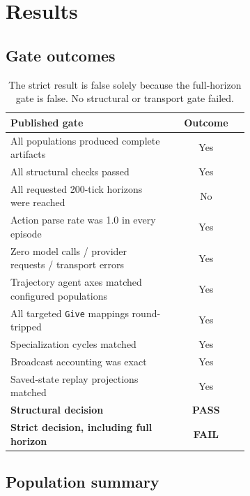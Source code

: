 \documentclass[11pt]{article}
\newcommand{\pass}{\textcolor{passgreen}{\textbf{PASS}}}
\newcommand{\fail}{\textcolor{failred}{\textbf{FAIL}}}
\newcommand{\code}[1]{\texttt{#1}}
\newcommand{\yes}{\textcolor{passgreen}{Yes}}
\newcommand{\no}{\textcolor{failred}{No}}
\begin{document}
\section{Results}

\subsection{Gate outcomes}

\begin{table}[ht]
\centering
\small
\begin{tabular}{@{}p{0.68\linewidth}c@{}}
\toprule
Published gate & Outcome\\
\midrule
All populations produced complete artifacts & \yes\\
All structural checks passed & \yes\\
All requested 200-tick horizons were reached & \no\\
Action parse rate was 1.0 in every episode & \yes\\
Zero model calls / provider requests / transport errors & \yes\\
Trajectory agent axes matched configured populations & \yes\\
All targeted \code{Give} mappings round-tripped & \yes\\
Specialization cycles matched & \yes\\
Broadcast accounting was exact & \yes\\
Saved-state replay projections matched & \yes\\
\midrule
\textbf{Structural decision} & \pass\\
\textbf{Strict decision, including full horizon} & \fail\\
\bottomrule
\end{tabular}
\caption{The strict result is false solely because the full-horizon gate is
false.  No structural or transport gate failed.}
\label{tab:gates}
\end{table}

\subsection{Population summary}
\end{document}
